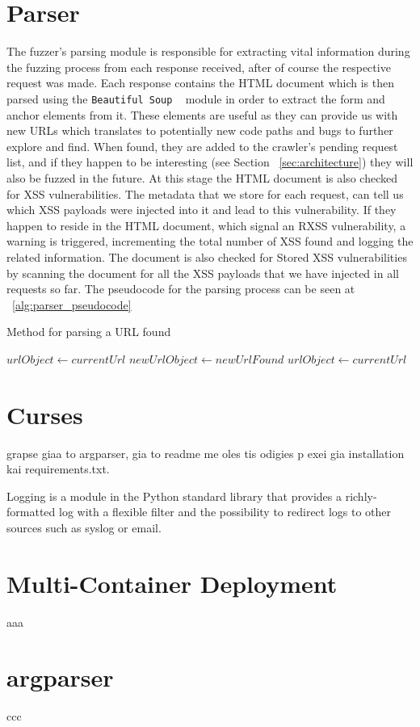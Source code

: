\section{Parser}
The fuzzer's parsing module is responsible for extracting vital information during the fuzzing process from each response received, after of course the respective request was made. Each response contains the HTML document which is then parsed using the {\tt  Beautiful Soup} ~\cite{beautiful_soup} module in order to extract the form and anchor elements from it. These elements are useful as they can provide us with new URLs which translates to potentially new code paths and bugs to further explore and find. When found, they are added to the crawler's pending request list, and if they happen to be interesting (see Section ~\ref{sec:architecture}) they will also be fuzzed in the future. At this stage the HTML document is also checked for XSS vulnerabilities. The metadata that we store for each request, can tell us which XSS payloads were injected into it and lead to this vulnerability. If they happen to reside in the HTML document, which signal an RXSS vulnerability, a warning is triggered, incrementing the total number of XSS found and logging the related information. The document is also checked for Stored XSS vulnerabilities by scanning the document for all the XSS payloads that we have injected in all requests so far. The pseudocode for the parsing process can be seen at  ~\ref{alg:parser_pseudocode}

\begin{algorithm}
 \caption{Method for parsing a URL found}
 \label{alg:parser_pseudocode}
 
 \begin{algorithmic}
	 \STATE $urlObject \leftarrow currentUrl$
	 \STATE $newUrlObject \leftarrow newUrlFound$
 		 \STATE $urlObject \leftarrow currentUrl$
 	 \ENDIF
 \end{algorithmic}
\end{algorithm}


\section{Curses}


grapse giaa to argparser, gia to readme me oles tis odigies p exei gia installation kai requirements.txt.

Logging is a module in the Python standard library that provides a richly-formatted log with a flexible filter and the possibility to redirect logs to other sources such as syslog or email.

\section{Multi-Container Deployment}
aaa

\section{argparser}
ccc